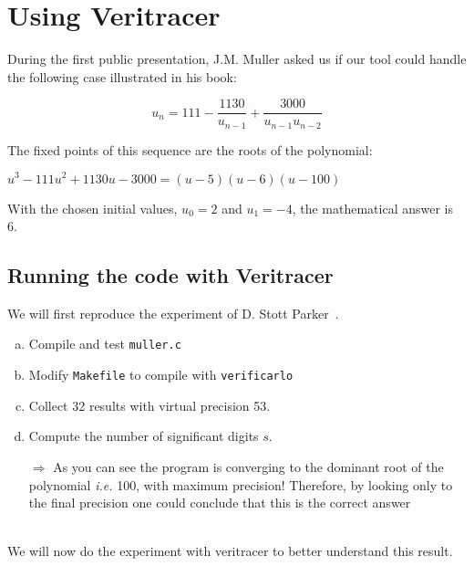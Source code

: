 \section{Using Veritracer}

During the first public presentation, J.M. Muller asked us if our tool could handle the following case illustrated in his book:

 \begin{equation}
   u_{n} = 111 - \dfrac{1130}{u_{n-1}} + \dfrac{3000}{u_{n-1}u_{n-2}}
   \label{eq:muller_sequence_un}
 \end{equation}

The fixed points of this sequence are the roots of the polynomial:

\quad $u^3 - 111u^2 + 1130u - 3000 = (u-5)(u-6)(u-100)$

With the chosen initial values, $u_0=2$ and $u_1=-4$, the mathematical answer is 6.

\subsection{Running the code with Veritracer}

We will first reproduce the experiment of D. Stott Parker~\cite{parker1997monte}.

\begin{question}
    \begin{enumerate}[(a)]
\item Compile and test {\tt muller.c}
\item Modify {\tt Makefile} to compile with {\tt verificarlo}
\item Collect 32 results with virtual precision 53.
\item Compute the number of significant digits $s$.

$\Rightarrow$ As you can see the program is converging to the dominant root of the polynomial {\it i.e.} 100, with maximum precision! Therefore, by looking only to the final precision one could conclude that this is the correct answer\\~\\

\end{enumerate}
\end{question}

We will now do the experiment with veritracer to better understand this result.


